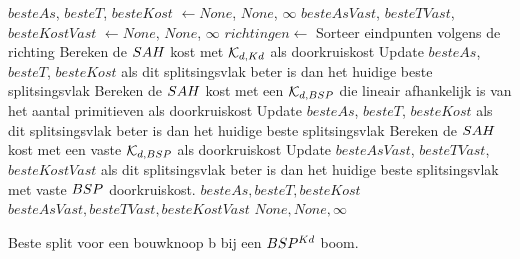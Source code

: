 \begin{dutchalgorithm}
    \begin{algorithmic}       
            \State $besteAs$, $besteT$, $besteKost$ $\gets None$, $None$, $\infty$
            \State $besteAsVast$, $besteTVast$, $besteKostVast$ $\gets None$, $None$, $\infty$
            \State $richtingen \gets $ 
                \State Sorteer eindpunten volgens de richting
                        \State Bereken de $SAH$ kost met $\mathcal{K}_{d,Kd}$ als doorkruiskost
                        \State Update $besteAs$, $besteT$, $besteKost$ als dit splitsingsvlak beter is dan het huidige beste splitsingsvlak
                    \EndFor   
                \Else
                        \State Bereken de $SAH$ kost met een $\mathcal{K}_{d,BSP}$ die lineair afhankelijk is van het aantal primitieven als doorkruiskost 
                        \State Update $besteAs$, $besteT$, $besteKost$ als dit splitsingsvlak beter is dan het huidige beste splitsingsvlak 
                        \State Bereken de $SAH$ kost met een vaste $\mathcal{K}_{d,BSP}$ als doorkruiskost
                        \State Update $besteAsVast$, $besteTVast$, $besteKostVast$ als dit splitsingsvlak beter is dan het huidige beste splitsingsvlak met vaste $BSP$ doorkruiskost. 
                \EndFor
                \EndIf   
            \EndFor
                \State \Return $besteAs, besteT, besteKost$
            \EndIf
                \State \Return $besteAsVast, besteTVast, besteKostVast$
            \EndIf
            \State \Return $None, None, \infty$
        \EndFunction
    \end{algorithmic}
    \caption{Beste split voor een bouwknoop b bij een $BSP^{Kd}$  boom.}
    \label{alg:bspsweepkd-beste-split}
\end{dutchalgorithm}

